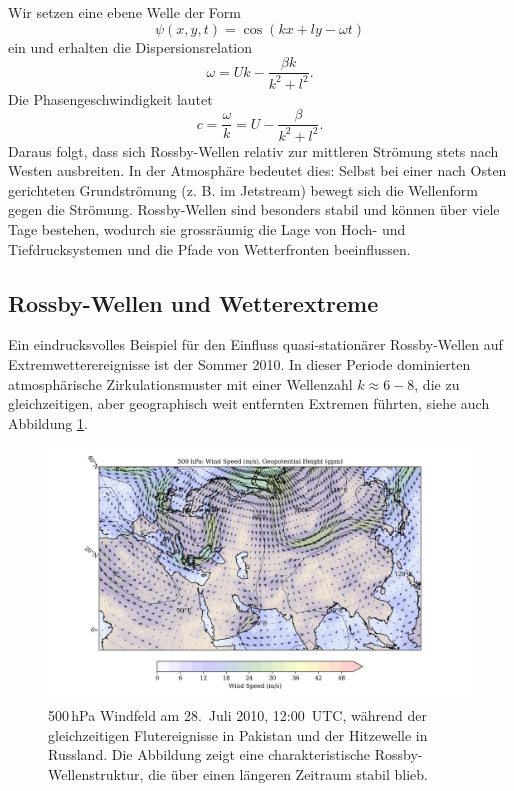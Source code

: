 Wir setzen eine ebene Welle der Form
\begin{equation}
	\psi(x,y,t) = \cos(kx + ly - \omega t)
	\label{rossby:eq:wave_solution}
\end{equation}
ein und erhalten die Dispersionsrelation
\begin{equation}
	\omega = U k - \frac{\beta k}{k^2 + l^2}.
	\label{rossby:eq:dispersion_relation}
\end{equation}
Die Phasengeschwindigkeit lautet
\begin{equation}
	c = \frac{\omega}{k} = U - \frac{\beta}{k^2 + l^2}.
	\label{rossby:eq:phase_speed}
\end{equation}
Daraus folgt, dass sich Rossby-Wellen relativ zur mittleren Strömung stets nach Westen ausbreiten. In der Atmosphäre bedeutet dies: Selbst bei einer nach Osten gerichteten Grundströmung (z. B. im Jetstream) bewegt sich die Wellenform gegen die Strömung. Rossby-Wellen sind besonders stabil und können über viele Tage bestehen, wodurch sie grossräumig die Lage von Hoch- und Tiefdrucksystemen und die Pfade von Wetterfronten beeinflussen.

\subsection{Rossby-Wellen und Wetterextreme}




Ein eindrucksvolles Beispiel für den Einfluss quasi-stationärer Rossby-Wellen
auf Extremwetterereignisse ist der Sommer 2010. In dieser Periode dominierten
atmosphärische Zirkulationsmuster mit einer Wellenzahl \(k \approx 6 - 8\), die zu
gleichzeitigen, aber geographisch weit entfernten Extremen führten, siehe auch Abbildung \ref{fig:rossby_2010}.


\begin{figure}
	\centering
	\includegraphics[width=\textwidth, trim=2cm 0cm 3cm 0cm, clip]{papers/rossby/images/data_2010_7_28_12_00_500.jpg}
	\caption{500\,hPa Windfeld am
		28.\ Juli 2010, 12:00~UTC, während der gleichzeitigen Flutereignisse in Pakistan und
		der Hitzewelle in Russland. Die Abbildung zeigt eine charakteristische Rossby-Wellenstruktur,
		die über einen längeren Zeitraum stabil blieb.}
	\label{fig:rossby_2010}
\end{figure}



